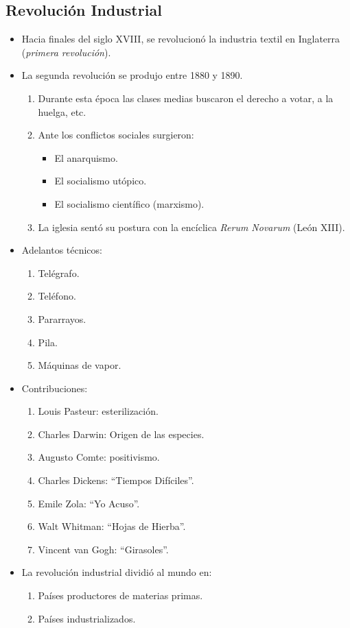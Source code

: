 \subsection{Revolución Industrial}

\begin{itemize}

\item Hacia finales del siglo XVIII, se revolucionó la industria textil en Inglaterra (\emph{primera revolución}).

\item La segunda revolución se produjo entre 1880 y 1890.
\begin{enumerate}
	\item Durante esta época las clases medias buscaron el derecho a votar, a la huelga, etc.
	\item Ante los conflictos sociales surgieron:
	\begin{itemize}
		\item El anarquismo.
		\item El socialismo utópico.
		\item El socialismo científico (marxismo).
	\end{itemize}
	\item La iglesia sentó su postura con la encíclica \emph{Rerum Novarum} (León XIII).
\end{enumerate}

\item Adelantos técnicos:
\begin{enumerate}
	\item Telégrafo.
	\item Teléfono.
	\item Pararrayos.
	\item Pila.
	\item Máquinas de vapor.
\end{enumerate}

\item Contribuciones:
\begin{enumerate}
	\item Louis Pasteur: esterilización.
	\item Charles Darwin: Origen de las especies.
	\item Augusto Comte: positivismo.
	\item Charles Dickens: ``Tiempos Difíciles''.
	\item Emile Zola: ``Yo Acuso''.
	\item Walt Whitman: ``Hojas de Hierba''.
	\item Vincent van Gogh: ``Girasoles''.
\end{enumerate}

\item La revolución industrial dividió al mundo en:
\begin{enumerate}
	\item Países productores de materias primas.
	\item Países industrializados.
\end{enumerate}

\end{itemize}